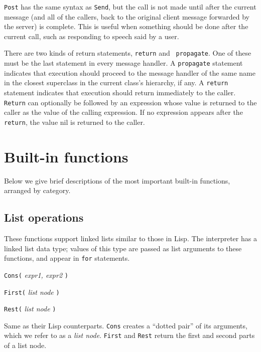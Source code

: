 \documentclass[12pt]{article}
\newenvironment{leftlines}
{\setlength{\oldindent}{\parindent}
 \setlength{\parindent}{0in}\vspace{\baselineskip}}
{\setlength{\parindent}{\oldindent}\vspace{\baselineskip}}
\begin{document}
\texttt{Post} has the same syntax as \texttt{Send}, but the
call is not made until after the current message (and all of the
callers, back to the original client message forwarded by the server)
is complete.  This is useful when something should be done after the
current call, such as responding to speech said by a user.

There are two kinds of return statements, {\tt return} and {\tt
propagate}.  One of these must be the last statement in every message
handler.  A {\tt propagate} statement indicates that execution should
proceed to the message handler of the same name in the closest
superclass in the current class's hierarchy, if any.  A {\tt return}
statement indicates that execution should return immediately to the
caller.  {\tt Return} can optionally be followed by an expression
whose value is returned to the caller as the value of the calling
expression.  If no expression appears after the {\tt return}, the
value nil is returned to the caller.


\section{Built-in functions}

Below we give brief descriptions of the most important built-in
functions, arranged by category.  

\subsection{List operations}

These functions support linked lists similar to those in Lisp.  The
interpreter has a linked list data type; values of this type are
passed as list arguments to these functions, and appear in {\tt for}
statements.

\newlength{\oldindent}

\newcommand{\function}[2]{ {\tt #1(} {\em #2} {\tt )} }

\begin{leftlines}
\function{Cons}{expr1, expr2}

\function{First}{list node}

\function{Rest}{list node}
\end{leftlines}

Same as their Lisp counterparts.  {\tt Cons} creates a ``dotted pair'' of
its arguments, which we refer to as a {\em list node}.  {\tt First}
and {\tt Rest} return the first and second parts of a list node.
\end{document}
